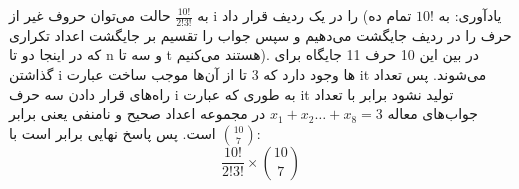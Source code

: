 \p
به
$\frac{10!}{2!3!}$
حالت می‌توان حروف غیر از i را در یک ردیف قرار داد
(یادآوری: به 
$10!$
تمام ده حرف را در ردیف جایگشت می‌دهیم و سپس جواب را تقسیم بر جایگشت اعداد تکراری که در اینجا دو تا n و سه تا t هستند می‌کنیم).
در بین این 10 حرف 11 جایگاه برای گذاشتن i ها وجود دارد که 3 تا از آن‌ها موجب ساخت عبارت it می‌شوند.
پس تعداد راه‌های قرار دادن سه حرف i به طوری که عبارت it تولید نشود برابر با تعداد جواب‌های معاله
$x_1 + x_2 \ldots + x_8 = 3$
در مجموعه اعداد صحیح و نامنفی یعنی برابر
$\binom{10}{7}$
است. پس پاسخ نهایی برابر است با:
$$\frac{10!}{2!3!}  \times \binom{10}{7}$$

